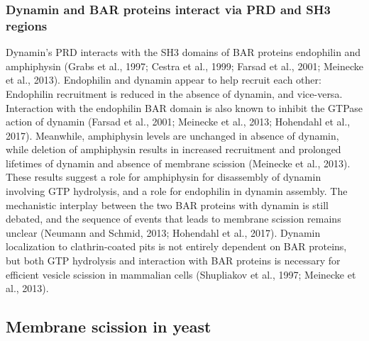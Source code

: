 		\subsubsection{Dynamin and BAR proteins interact via PRD and SH3 regions }
Dynamin’s PRD interacts with the SH3 domains of BAR proteins endophilin and amphiphysin (Grabs et al., 1997; Cestra et al., 1999; Farsad et al., 2001; Meinecke et al., 2013). Endophilin and dynamin appear to help recruit each other: Endophilin recruitment is reduced in the absence of dynamin, and vice-versa. Interaction with the endophilin BAR domain is also known to inhibit the GTPase action of dynamin (Farsad et al., 2001; Meinecke et al., 2013; Hohendahl et al., 2017). Meanwhile, amphiphysin levels are unchanged in absence of dynamin, while deletion of amphiphysin results in increased recruitment and prolonged lifetimes of dynamin and absence of membrane scission (Meinecke et al., 2013). These results suggest a role for amphiphysin for disassembly of dynamin involving GTP hydrolysis, and a role for endophilin in dynamin assembly. The mechanistic interplay between the two BAR proteins with dynamin is still debated, and the sequence of events that leads to membrane scission remains unclear (Neumann and Schmid, 2013; Hohendahl et al., 2017). Dynamin localization to clathrin-coated pits is not entirely dependent on BAR proteins, but both GTP hydrolysis and interaction with BAR proteins is necessary for efficient vesicle scission in mammalian cells (Shupliakov et al., 1997; Meinecke et al., 2013).


\label{key}

	\subsection{Membrane scission in yeast} \label{yeast_scission}
